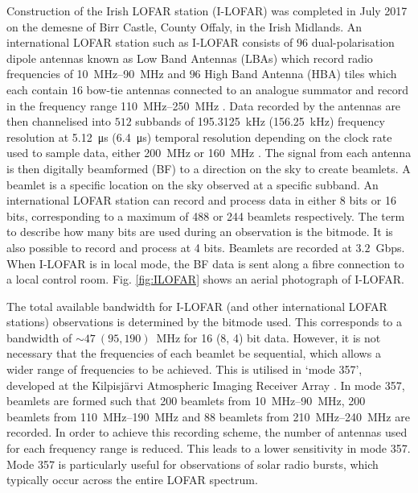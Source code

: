 Construction of the Irish LOFAR station (I-LOFAR) was completed in July 2017 on the demesne of Birr Castle, County Offaly, in the Irish Midlands. An international LOFAR station such as I-LOFAR consists of $96$ dual-polarisation dipole antennas known as Low Band Antennas (LBAs) which record radio frequencies of \SIrange{10}{90}{\mega\hertz} and $96$ High Band Antenna (HBA) tiles which each contain $16$ bow-tie antennas connected to an analogue summator and record in the frequency range \SIrange{110}{250}{\mega\hertz} \citep[see][ for a full description of LOFAR antennas]{VanHaarlem2013}. Data recorded by the antennas are then channelised into $512$ subbands of \SI{195.3125}{\kilo\hertz} (\SI{156.25}{\kilo\hertz}) frequency resolution at \SI{5.12}{\micro\second} (\SI{6.4}{\micro\second}) temporal resolution depending on the clock rate used to sample data, either \SI{200}{\mega \hertz} or \SI{160}{\mega \hertz} \citep{VanHaarlem2013}. The signal from each antenna is then digitally beamformed (BF) to a direction on the sky to create beamlets. A beamlet is a specific location on the sky observed at a specific subband. An international LOFAR station can record and process data in either 8 bits or 16 bits, corresponding to a maximum of 488 or 244 beamlets respectively. The term to describe how many bits are used during an observation is the bitmode. It is also possible to record and process at 4 bits. Beamlets are recorded at $3.2$~Gbps. When I-LOFAR is in local mode, the BF data is sent along a fibre connection to a local control room. Fig. \ref{fig:ILOFAR} shows an aerial photograph of I-LOFAR. 

The total available bandwidth for I-LOFAR (and other international LOFAR stations) observations is determined by the bitmode used. %
This corresponds to a bandwidth of $\sim 47 \ (95, 190)$~MHz for 16 (8, 4) bit data. However, it is not necessary that the frequencies of each beamlet be sequential, which allows  a wider range of frequencies to be achieved. 
This is utilised in `mode 357', developed at the Kilpisjärvi Atmospheric Imaging Receiver Array \citep[KAIRA;][]{McKay-Bukowski2015}. In mode 357, beamlets are formed such that 200 beamlets from \SIrange{10}{90}{\mega\hertz}, 200 beamlets from \SIrange{110}{190}{\mega\hertz} and 88 beamlets from \SIrange{210}{240}{\mega\hertz} are recorded. In order to achieve this recording scheme, the number of antennas used for each frequency range is reduced. This leads to a lower sensitivity in mode 357. Mode 357 is particularly useful for observations of solar radio bursts, which typically occur across the entire LOFAR spectrum.

